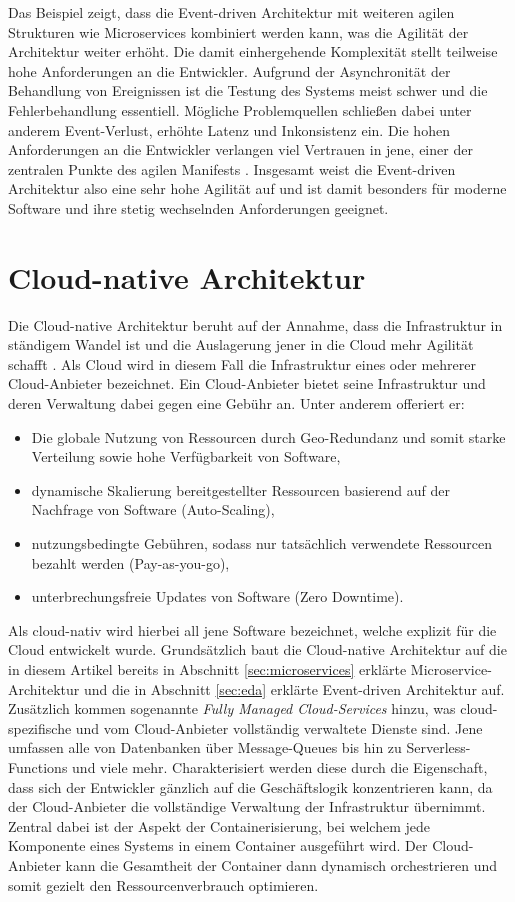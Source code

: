 \documentclass[acmtog]{acmart}
\begin{document}
Das Beispiel zeigt, dass die Event-driven Architektur mit weiteren agilen Strukturen wie Microservices kombiniert werden kann, was die Agilität der Architektur weiter erhöht.
Die damit einhergehende Komplexität stellt teilweise hohe Anforderungen an die Entwickler.
Aufgrund der Asynchronität der Behandlung von Ereignissen ist die Testung des Systems meist schwer und die Fehlerbehandlung essentiell.
Mögliche Problemquellen schließen dabei unter anderem Event-Verlust, erhöhte Latenz und Inkonsistenz ein.
Die hohen Anforderungen an die Entwickler verlangen viel Vertrauen in jene, einer der zentralen Punkte des agilen Manifests \cite{agileManifesto}.
Insgesamt weist die Event-driven Architektur also eine sehr hohe Agilität auf und ist damit besonders für moderne Software und ihre stetig wechselnden Anforderungen geeignet.

\section{Cloud-native Architektur}
\label{sec:cloudnative}
Die Cloud-native Architektur beruht auf der Annahme, dass die Infrastruktur in ständigem Wandel ist und die Auslagerung jener in die Cloud mehr Agilität schafft \cite{cloudNative}.
Als Cloud wird in diesem Fall die Infrastruktur eines oder mehrerer Cloud-Anbieter bezeichnet.
Ein Cloud-Anbieter bietet seine Infrastruktur und deren Verwaltung dabei gegen eine Gebühr an.
Unter anderem offeriert er:
\begin{itemize}
  \item Die globale Nutzung von Ressourcen durch Geo-Redundanz und somit starke Verteilung sowie hohe Verfügbarkeit von Software,
  \item dynamische Skalierung bereitgestellter Ressourcen basierend auf der Nachfrage von Software (Auto-Scaling),
  \item nutzungsbedingte Gebühren, sodass nur tatsächlich verwendete Ressourcen bezahlt werden (Pay-as-you-go),
  \item unterbrechungsfreie Updates von Software (Zero Downtime).
\end{itemize}

Als cloud-nativ wird hierbei all jene Software bezeichnet, welche explizit für die Cloud entwickelt wurde.
Grundsätzlich baut die Cloud-native Architektur auf die in diesem Artikel bereits in Abschnitt \ref{sec:microservices} erklärte Microservice-Architektur und die
in Abschnitt \ref{sec:eda} erklärte Event-driven Architektur auf.
Zusätzlich kommen sogenannte \textit{Fully Managed Cloud-Services} hinzu, was cloud-spezifische und vom Cloud-Anbieter vollständig verwaltete Dienste sind.
Jene umfassen alle von Datenbanken über Message-Queues bis hin zu Serverless-Functions und viele mehr.
Charakterisiert werden diese durch die Eigenschaft, dass sich der Entwickler gänzlich auf die Geschäftslogik konzentrieren kann, da der Cloud-Anbieter
die vollständige Verwaltung der Infrastruktur übernimmt.
Zentral dabei ist der Aspekt der Containerisierung, bei welchem jede Komponente eines Systems in einem Container ausgeführt wird.
Der Cloud-Anbieter kann die Gesamtheit der Container dann dynamisch orchestrieren und somit gezielt den Ressourcenverbrauch optimieren.
\end{document}
